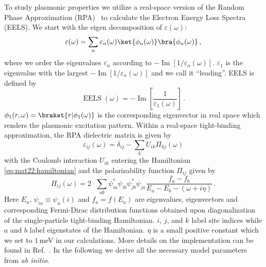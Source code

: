 To study plasmonic properties we utilize a real-space version of the Random Phase Approximation (RPA)~\cite{Vonsov2012QuantumSolidS,giuliani_quantum_2005,wang_plasmonic_2015,westerhout_plasmon_2018,jiang_plasmonic_2021} to calculate the Electron Energy Loss Spectra (EELS). We start with the eigen decomposition of $\varepsilon(\omega)$:
\begin{equation*}
    \varepsilon(\omega) = \sum_n \varepsilon_n(\omega) \ket{\phi_n(\omega)} \bra{\phi_n(\omega)} \,,
\end{equation*}
where we order the eigenvalues $\varepsilon_n$ according to $-\operatorname{Im}[1 / \varepsilon_n(\omega)]$. $\varepsilon_1$ is the eigenvalue with the largest $-\operatorname{Im}[1 / \varepsilon_n(\omega)]$ and we call it ``leading''. EELS is defined by
\begin{equation*}
    \operatorname{EELS}(\omega) = 
    -\operatorname{Im}\left[ \frac{1}{\varepsilon_1(\omega)} \right] \,.
\end{equation*}
$\phi_1(r, \omega) = \braket{r | \phi_1(\omega)}$ is the corresponding eigenvector in real space which renders the plasmonic excitation pattern. Within a real-space tight-binding approximation, the RPA dielectric matrix is given by
\begin{equation}\label{eq:mat22:Eps_pz}
    \varepsilon_{ij}(\omega) =
        \delta_{ij} -
        \sum_{k} U_{ik} \Pi_{kj}(\omega)
\end{equation}
with the Coulomb interaction $U_{ik}$ entering the Hamiltonian \eqref{eq:mat22:hamiltonian} and the polarizability function $\Pi_{ij}$ given by
\begin{equation}\label{eq:mat22:Pi_pz}
    \Pi_{ij}(\omega) = 
        2 \cdot \sum_{ab} \psi_{ia}^* \psi_{ib} \psi_{jb}^* \psi_{ja}
        \frac{f_a - f_b}{E_a - E_b - (\omega + i\eta)} \,.
\end{equation}
Here $E_a$, $\psi_{ia} \equiv \psi_{a}(i)$ and $f_a = f(E_a)$ are eigenvalues, eigenvectors and corresponding Fermi-Dirac distribution functions obtained upon diagonalization of the single-particle tight-binding Hamiltonian. $i$, $j$, and $k$ label site indices while $a$ and $b$ label eigenstates of the Hamiltonian. $\eta$ is a small positive constant which we set to $1\,$meV in our calculations. More details on the implementation can be found in Ref.~\cite{westerhout_plasmon_2018}.
In the following we derive all the necessary model parameters from \textit{ab initio}.
    
